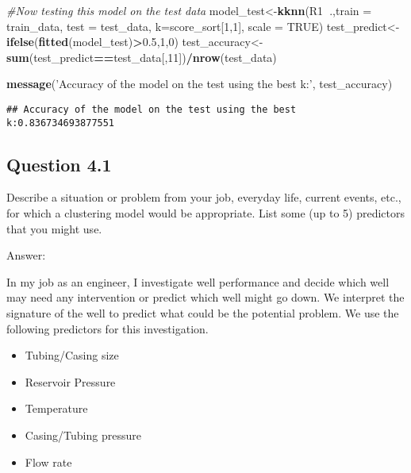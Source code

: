 \documentclass[
]{article}
\newenvironment{Shaded}{\begin{snugshade}}{\end{snugshade}}
\newcommand{\CommentTok}[1]{\textcolor[rgb]{0.56,0.35,0.01}{\textit{#1}}}
\newcommand{\DataTypeTok}[1]{\textcolor[rgb]{0.13,0.29,0.53}{#1}}
\newcommand{\DecValTok}[1]{\textcolor[rgb]{0.00,0.00,0.81}{#1}}
\newcommand{\FloatTok}[1]{\textcolor[rgb]{0.00,0.00,0.81}{#1}}
\newcommand{\KeywordTok}[1]{\textcolor[rgb]{0.13,0.29,0.53}{\textbf{#1}}}
\newcommand{\NormalTok}[1]{#1}
\newcommand{\OperatorTok}[1]{\textcolor[rgb]{0.81,0.36,0.00}{\textbf{#1}}}
\newcommand{\OtherTok}[1]{\textcolor[rgb]{0.56,0.35,0.01}{#1}}
\newcommand{\StringTok}[1]{\textcolor[rgb]{0.31,0.60,0.02}{#1}}
\providecommand{\tightlist}{%
  \setlength{\itemsep}{0pt}\setlength{\parskip}{0pt}}
\begin{document}
\begin{Shaded}
\begin{Highlighting}[]
\CommentTok{#Now testing this model  on the test data}
\NormalTok{model_test<-}\KeywordTok{kknn}\NormalTok{(R1}\OperatorTok{~}\NormalTok{.,}\DataTypeTok{train =}\NormalTok{ train_data, }\DataTypeTok{test =}\NormalTok{ test_data, }\DataTypeTok{k=}\NormalTok{score_sort[}\DecValTok{1}\NormalTok{,}\DecValTok{1}\NormalTok{],}
                 \DataTypeTok{scale =} \OtherTok{TRUE}\NormalTok{)}
\NormalTok{test_predict<-}\KeywordTok{ifelse}\NormalTok{(}\KeywordTok{fitted}\NormalTok{(model_test)}\OperatorTok{>}\FloatTok{0.5}\NormalTok{,}\DecValTok{1}\NormalTok{,}\DecValTok{0}\NormalTok{)}
\NormalTok{test_accuracy<-}\KeywordTok{sum}\NormalTok{(test_predict}\OperatorTok{==}\NormalTok{test_data[,}\DecValTok{11}\NormalTok{])}\OperatorTok{/}\KeywordTok{nrow}\NormalTok{(test_data)}

\KeywordTok{message}\NormalTok{(}\StringTok{'Accuracy of the model on the test using the best k:'}\NormalTok{, test_accuracy)}
\end{Highlighting}
\end{Shaded}

\begin{verbatim}
## Accuracy of the model on the test using the best k:0.836734693877551
\end{verbatim}

\hypertarget{question-4.1}{%
\subsection{Question 4.1}\label{question-4.1}}

Describe a situation or problem from your job, everyday life, current
events, etc., for which a clustering model would be appropriate. List
some (up to 5) predictors that you might use.

Answer:

In my job as an engineer, I investigate well performance and decide
which well may need any intervention or predict which well might go
down. We interpret the signature of the well to predict what could be
the potential problem. We use the following predictors for this
investigation.

\begin{itemize}
\tightlist
\item
  Tubing/Casing size
\item
  Reservoir Pressure
\item
  Temperature
\item
  Casing/Tubing pressure
\item
  Flow rate
\end{itemize}
\end{document}
